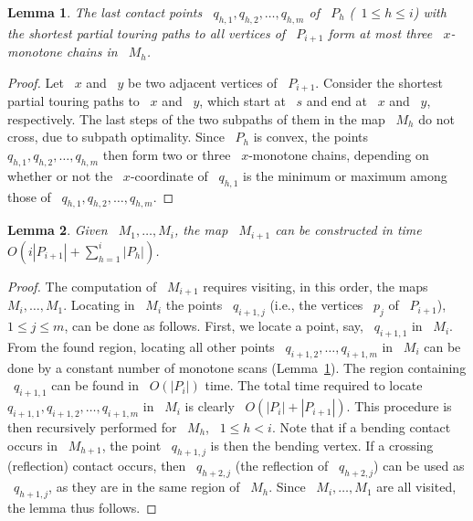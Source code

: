 \documentclass[11pt]{article}
\newtheorem{lemma}{Lemma}
\begin{document}
\begin{lemma}
\label{lem:xmonotone}
The last contact points ~\(q_{h,1}, q_{h,2}, \ldots, q_{h,m}\) of ~\(P_h\) (~\(1 \le h \le i\)) with the shortest partial touring paths to all vertices of ~\(P_{i+1}\) form at most three ~\(x\)-monotone chains in ~\(M_h\).
\end{lemma}

\begin{proof}
Let ~\(x\) and ~\(y\) be two adjacent vertices of ~\(P_{i+1}\).
Consider the shortest partial touring paths to ~\(x\) and ~\(y\), which start at ~\(s\) and end at ~\(x\) and ~\(y\), respectively.
The last steps of the two subpaths of them in the map ~\(M_h\) do not cross, due to subpath optimality.
Since ~\(P_h\) is convex, the points ~\(q_{h,1}, q_{h,2}, \ldots, q_{h,m}\) then form two or three ~\(x\)-monotone chains, depending on whether or not the ~\(x\)-coordinate of ~\(q_{h,1}\) is the minimum or maximum among those of ~\(q_{h,1}, q_{h,2}, \ldots, q_{h,m}\).
\end{proof}

\begin{lemma}
\label{lem:constructMi1}
Given ~\(M_1, \ldots, M_i\), the map ~\(M_{i+1}\) can be constructed in time ~\(O\!\left(i|P_{i+1}| + \sum_{h=1}^i |P_h|\right)\).
\end{lemma}

\begin{proof}
The computation of ~\(M_{i+1}\) requires visiting, in this order, the maps ~\(M_i, \ldots, M_1\).
Locating in ~\(M_i\) the points ~\(q_{i+1,j}\) (i.e., the vertices ~\(p_j\) of ~\(P_{i+1}\)), ~\(1 \le j \le m\), can be done as follows.
First, we locate a point, say, ~\(q_{i+1,1}\) in ~\(M_i\).
From the found region, locating all other points ~\(q_{i+1,2}, \ldots, q_{i+1,m}\) in ~\(M_i\) can be done by a constant number of monotone scans (Lemma~\ref{lem:xmonotone}).
The region containing ~\(q_{i+1,1}\) can be found in ~\(O(|P_i|)\) time.
The total time required to locate ~\(q_{i+1,1}, q_{i+1,2}, \ldots, q_{i+1,m}\) in ~\(M_i\) is clearly ~\(O(|P_i| + |P_{i+1}|)\).
This procedure is then recursively performed for ~\(M_h\), ~\(1 \le h < i\).
Note that if a bending contact occurs in ~\(M_{h+1}\), the point ~\(q_{h+1,j}\) is then the bending vertex.
If a crossing (reflection) contact occurs, then ~\(q_{h+2,j}\) (the reflection of ~\(q_{h+2,j}\)) can be used as ~\(q_{h+1,j}\), as they are in the same region of ~\(M_h\).
Since ~\(M_i, \ldots, M_1\) are all visited, the lemma thus follows.
\end{proof}
\end{document}
